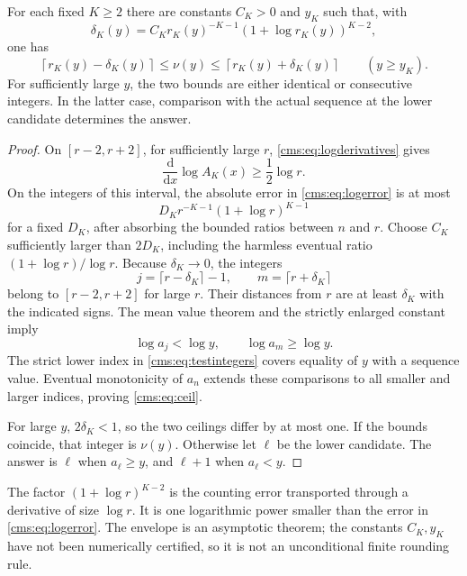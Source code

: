 \begin{theorem}\label{cms:thm:inverse}
For each fixed $K\geq2$ there are constants $C_K>0$ and $y_K$ such that, with
\begin{equation}\label{cms:eq:delta}
\delta_K(y)=C_Kr_K(y)^{-K-1}(1+\log r_K(y))^{K-2},
\end{equation}
one has
\begin{equation}\label{cms:eq:ceil}
\left\lceil r_K(y)-\delta_K(y)\right\rceil
\leq\nu(y)\leq
\left\lceil r_K(y)+\delta_K(y)\right\rceil
\qquad(y\geq y_K).
\end{equation}
For sufficiently large $y$, the two bounds are either identical or consecutive integers. In the latter case, comparison with the actual sequence at the lower candidate determines the answer.
\end{theorem}
\begin{proof}
On $[r-2,r+2]$, for sufficiently large $r$, \eqref{cms:eq:logderivatives} gives
\[
\frac{\mathrm d}{\mathrm dx}\log A_K(x)\geq\frac12\log r.
\]
On the integers of this interval, the absolute error in \eqref{cms:eq:logerror} is at most
\[
D_Kr^{-K-1}(1+\log r)^{K-1}
\]
for a fixed $D_K$, after absorbing the bounded ratios between $n$ and $r$. Choose $C_K$ sufficiently larger than $2D_K$, including the harmless eventual ratio $(1+\log r)/\log r$. Because $\delta_K\to0$, the integers
\begin{equation}\label{cms:eq:testintegers}
j=\lceil r-\delta_K\rceil-1,\qquad m=\lceil r+\delta_K\rceil
\end{equation}
belong to $[r-2,r+2]$ for large $r$. Their distances from $r$ are at least $\delta_K$ with the indicated signs. The mean value theorem and the strictly enlarged constant imply
\[
\log a_j<\log y,\qquad \log a_m\geq\log y.
\]
The strict lower index in \eqref{cms:eq:testintegers} covers equality of $y$ with a sequence value. Eventual monotonicity of $a_n$ extends these comparisons to all smaller and larger indices, proving \eqref{cms:eq:ceil}.

For large $y$, $2\delta_K<1$, so the two ceilings differ by at most one. If the bounds coincide, that integer is $\nu(y)$. Otherwise let $\ell$ be the lower candidate. The answer is $\ell$ when $a_\ell\geq y$, and $\ell+1$ when $a_\ell<y$.
\end{proof}

The factor $(1+\log r)^{K-2}$ is the counting error transported through a derivative of size $\log r$. It is one logarithmic power smaller than the error in \eqref{cms:eq:logerror}. The envelope is an asymptotic theorem; the constants $C_K,y_K$ have not been numerically certified, so it is not an unconditional finite rounding rule.

